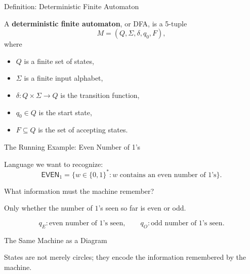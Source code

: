 \documentclass[10pt,aspectratio=169]{beamer}
\newcommand{\lang}[1]{\mathsf{#1}}
\begin{document}
\begin{frame}{Definition: Deterministic Finite Automaton}

A \textbf{deterministic finite automaton}, or DFA, is a 5-tuple
\[
M=(Q,\Sigma,\delta,q_0,F),
\]
where

\begin{itemize}
\item $Q$ is a finite set of states,
\item $\Sigma$ is a finite input alphabet,
\item $\delta:Q\times\Sigma\rightarrow Q$ is the transition function,
\item $q_0\in Q$ is the start state,
\item $F\subseteq Q$ is the set of accepting states.
\end{itemize}

\end{frame}

\begin{frame}{The Running Example: Even Number of 1's}

Language we want to recognize:
\[
\lang{EVEN}_1=\{w\in\{0,1\}^*: w\text{ contains an even number of }1\text{'s}\}.
\]

\pause

What information must the machine remember?

\pause

Only whether the number of $1$'s seen so far is even or odd.

\[
q_E: \text{even number of }1\text{'s seen},
\qquad
q_O: \text{odd number of }1\text{'s seen}.
\]

\end{frame}

\begin{frame}{The Same Machine as a Diagram}

\begin{center}
\end{center}

\vspace{0.5em}

States are not merely circles; they encode the information remembered by the machine.

\end{frame}
\end{document}
